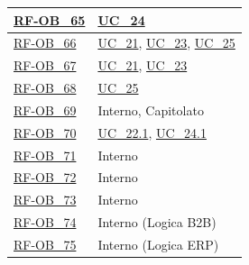 \begin{longtable}{|>{\raggedright}p{}|>{\raggedright\arraybackslash}p{}|}
    \hyperlink{rf-ob_65}{RF-OB\_65} & \hyperref[uc_24]{UC\_24} \\ \hline
    \hyperlink{rf-ob_66}{RF-OB\_66} & \hyperref[uc_21]{UC\_21}, \hyperref[uc_23]{UC\_23}, \hyperref[uc_25]{UC\_25} \\ \hline
    \hyperlink{rf-ob_67}{RF-OB\_67} & \hyperref[uc_21]{UC\_21}, \hyperref[uc_23]{UC\_23} \\ \hline
    \hyperlink{rf-ob_68}{RF-OB\_68} & \hyperref[uc_25]{UC\_25} \\ \hline
    \hyperlink{rf-ob_69}{RF-OB\_69} & Interno, Capitolato \\ \hline
    \hyperlink{rf-ob_70}{RF-OB\_70} & \hyperref[uc_22.1]{UC\_22.1}, \hyperref[uc_24.1]{UC\_24.1} \\ \hline
    \hyperlink{rf-ob_71}{RF-OB\_71} & Interno \\ \hline
    \hyperlink{rf-ob_72}{RF-OB\_72} & Interno \\ \hline
    \hyperlink{rf-ob_73}{RF-OB\_73} & Interno \\ \hline
    \hyperlink{rf-ob_74}{RF-OB\_74} & Interno (Logica B2B) \\ \hline
    \hyperlink{rf-ob_75}{RF-OB\_75} & Interno (Logica ERP) \\ \hline
    

\end{longtable}
